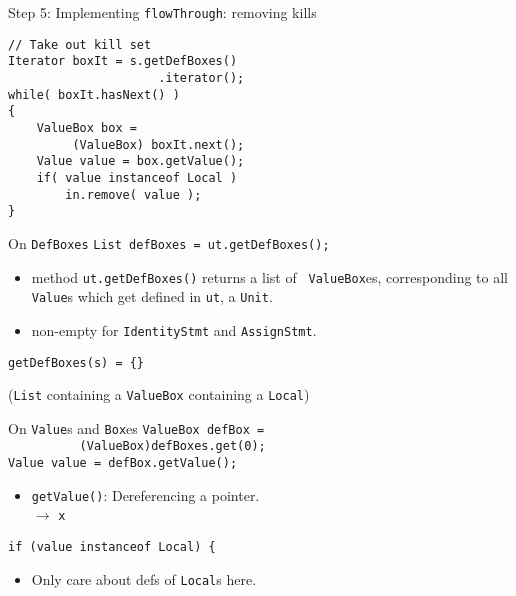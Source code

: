 \begin{slide}{Step 5: Implementing {\tt flowThrough}: removing kills}
\begin{verbatim}
// Take out kill set
Iterator boxIt = s.getDefBoxes()
                     .iterator();
while( boxIt.hasNext() ) 
{
    ValueBox box = 
         (ValueBox) boxIt.next();
    Value value = box.getValue();
    if( value instanceof Local )
        in.remove( value );
}
\end{verbatim}
\end{slide}

\begin{slide}{On {\tt DefBoxes}}
\vspace*{-0.1in}
{\tt List defBoxes = ut.getDefBoxes();}

\vspace*{-0.05in}
\begin{itemize}
\item method {\red \tt ut.getDefBoxes()} returns a list of {\tt
ValueBox}es, corresponding to all {\tt Value}s which get defined
in {\tt ut}, a {\tt Unit}. 

\item non-empty for {\tt IdentityStmt} and {\tt AssignStmt}.
\end{itemize}

\vspace*{-0.08in}
\begin{center}
\end{center}

\vspace*{0.05in}
{\tt getDefBoxes(s) = \{\}}\\
\qquad \qquad \begin{minipage}{0.7\textwidth} 
({\tt List} containing a {\tt ValueBox} containing a {\tt Local})
\end{minipage}

\end{slide}

\begin{slide}{On {\tt Value}s and {\tt Box}es}
\verb+ValueBox defBox = +\\
\verb+          (ValueBox)defBoxes.get(0);+\\
{\red \verb+Value value = defBox.getValue();+}

\begin{itemize}
\item {\tt getValue()}: Dereferencing a pointer.\\
\qquad \qquad \qquad \qquad {} $\to$ {\tt x}
\end{itemize}

\verb+if (value instanceof Local) {+

\begin{itemize}
\item Only care about defs of {\tt Local}s here.
\end{itemize}
\end{slide}

